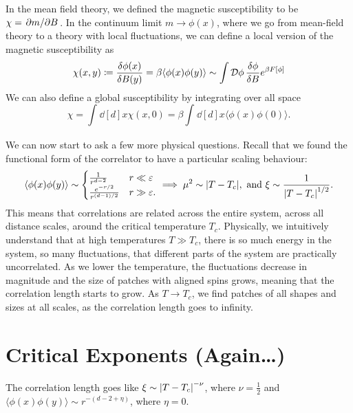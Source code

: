 In the mean field theory, we defined the magnetic susceptibility to be $\chi = \pdv*{m}{B}$. In the continuum limit $m \to \phi(x)$, where we go from mean-field theory to a theory with local fluctuations, we can define a local version of the magnetic susceptibility as
\begin{equation}
  \chi(x, y) \coloneqq \fdv{\phi(x)}{B(y)} = \beta \langle \phi(x) \phi(y) \rangle \sim \int \pdd{\phi} \fdv{\phi}{B} e^{\beta F[\phi]}
\end{equation}
We can also define a global susceptibility by integrating over all space
\begin{equation}
  \chi = \int_{}^{} \dd[d]{x} \chi(x, 0) = \beta \int_{}^{} \dd[d]{x} \langle \phi(x) \phi(0) \rangle.
\end{equation}

We can now start to ask a few more physical questions.
Recall that we found the functional form of the correlator to have a particular scaling behaviour:
\begin{equation}
  \langle \phi(x) \phi(y) \rangle \sim 
  \begin{cases}
    \frac{1}{r^{d-2}} & r \ll \varepsilon \\
    \frac{e^{-r/2}}{r^{(d-1)/2}} & r \gg \varepsilon.
  \end{cases}
  \implies 
  \mu^2 \sim \abs{T - T_c}, \text{ and } \xi \sim \frac{1}{\abs{T - T_c}^{1/2}}.
\end{equation}
This means that correlations are related across the entire system, across all distance scales, around the critical temperature $T_c$.
Physically, we intuitively understand that at high temperatures $T \gg T_c$, there is so much energy in the system, so many fluctuations, that different parts of the system are practically uncorrelated.
As we lower the temperature, the fluctuations decrease in magnitude and the size of patches with aligned spins grows, meaning that the correlation length starts to grow.
As $T \to T_c$, we find patches of all shapes and sizes at all scales, as the correlation length goes to infinity.

\section{Critical Exponents (Again\ldots)}%
\label{sec:critical_exponents_againldots_}

The correlation length goes like $\xi \sim \abs{T - T_c}^{-\nu}$, where $\nu = \frac{1}{2}$ and $\langle \phi(x) \phi(y) \rangle \sim r^{-(d-2 + \eta)}$, where $\eta = 0$.



